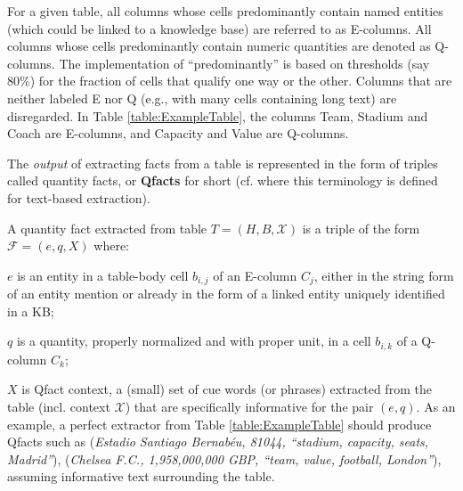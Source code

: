 
\vspace{0.1cm}
For a given table, all columns whose cells 
predominantly contain named entities (which could be
linked to a knowledge base) are referred to as
E-columns. 
All columns whose cells predominantly contain
numeric quantities are denoted as Q-columns.
%
The implementation of ``predominantly'' is
based on thresholds (say 80\%) for the
fraction of cells that qualify
one way or the other. 
Columns that are neither labeled E nor Q
(e.g., with many cells containing long text)
are disregarded.
%
In Table \ref{table:ExampleTable}, the columns
Team, Stadium and Coach are E-columns, and
Capacity and Value are Q-columns. 

\vspace{0.1cm}

The \textit{output} of extracting facts from a table is represented in the form of triples called 
{quantity facts}, or {\bf Qfacts} for short
(cf. \cite{DBLP:conf/semweb/HoIPBW19} where this terminology is
defined for text-based extraction).

\vspace{0.1cm}
A quantity fact extracted from table
$T = (H, B, \mathcal{X})$ is a triple of the form
$\mathcal{F} = (e, q, X)$ where:
\squishlist
\item[-] $e$ is an entity in a table-body cell $b_{i,j}$ of an
E-column $C_j$, either in the string form of an entity mention or already in the form of a linked entity
uniquely identified in a KB;
\item[-] $q$ is a quantity, properly normalized and with proper unit, in a cell $b_{i,k}$ of a Q-column $C_k$;
\item[-] $X$ is Qfact context, a (small) set of cue words 
(or phrases)
extracted from the table (incl. context $\mathcal{X}$)
that are specifically
informative for the pair $(e, q)$.
\squishend
\vspace{0.1cm}
As an example, a perfect extractor from Table \ref{table:ExampleTable} should produce Qfacts such
as 
(\textit{Estadio Santiago Bernab\'{e}u, 81044,
``stadium, capacity, seats, Madrid''}),
(\textit{Chelsea F.C., 1,958,000,000 GBP,
``team, value, football, London''}),
assuming informative text surrounding the table.

